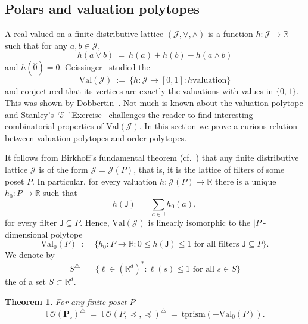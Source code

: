 \documentclass[11pt]{amsart}
\newtheorem{thm}{Theorem}[section]
\theoremstyle{definition}
\begin{document}
\subsection{Polars and valuation polytopes}\label{ssec:val}

A real-valued {\textbf{\color{black}{valuation}}} on a finite distributive lattice
$({\mathcal{J}},\vee,\wedge)$ is a function $h : {\mathcal{J}} \rightarrow {\mathbb{R}}$ such
that for any $a,b \in {\mathcal{J}}$, 
\begin{equation}
    h(a \vee b) \ = \ h(a) + h(b) - h(a \wedge b)
\end{equation}
and $h({\widehat{0}}) = 0$. Geissinger~\cite{Geissinger} studied the
{\textbf{\color{black}{valuation polytope}}}
\[
    {\mathrm{Val}}({\mathcal{J}}) \ := \ \{ h : {\mathcal{J}} \rightarrow [0,1] : h \text{
    valuation} \}
\]
and conjectured that its vertices are exactly the valuations with values in
$\{0,1\}$. This was shown by Dobbertin~\cite{Dobbertin}. Not much is known
about the valuation polytope and Stanley's
\emph{`5-'}-Exercise~\cite[Ex.~4.61(h)]{EC1new} challenges the reader to find
interesting combinatorial properties of ${\mathrm{Val}}({\mathcal{J}})$.  In this section we
prove a curious relation between valuation polytopes and order polytopes. 

It follows from Birkhoff's fundamental theorem (cf.~\cite[Sect.~3.4]{EC1new})
that any finite distributive lattice ${\mathcal{J}}$ is of the form ${\mathcal{J}} =
{\mathcal{J}}({P})$, that is, it is the lattice of filters of some poset ${P}$. In
particular, for every valuation $h : {\mathcal{J}}({P}) \rightarrow {\mathbb{R}}$ there is a
unique $h_0 : {P} \rightarrow {\mathbb{R}}$ such that
\[
    h({\mathsf{J}}) \ = \ \sum_{a \in {\mathsf{J}}} h_0(a),
\]
for every filter ${\mathsf{J}} \subseteq {P}$. Hence, ${\mathrm{Val}}({\mathcal{J}})$ is linearly
isomorphic to the $|{P}|$-dimensional polytope
\[
    {{\mathrm{Val}}_0} ({P}) \ := \ \{ h_0 : {P} \rightarrow {\mathbb{R}} : 0 \le
    h({\mathsf{J}}) \le
    1 \text{ for all filters } {\mathsf{J}} \subseteq {P} \}.
\]
We denote by
\[
    S^{\triangle} \ = \ \{ \ell \in ({\mathbb{R}}^d)^* : \ell(s) \le 1 \text{ for all } s \in
    S \}
\]
the {\textbf{\color{black}{polar}}} of a set $S \subset {\mathbb{R}}^d$.     

\begin{thm}\label{thm:twisted_val}
    For any finite poset ${P}$
    \[
    {{\mathbb{T}}{\mathcal{O}({{{\mathbf{P}}_\circ}})}}^{\triangle} \ = \ {{\mathbb{T}}{\mathcal{O}({{{P},\preceq,\preceq}})}}^{\triangle} \ = \
    {\mathrm{tprism}({-{{\mathrm{Val}}_0}({P})})}.
    \] 
\end{thm}
\end{document}
